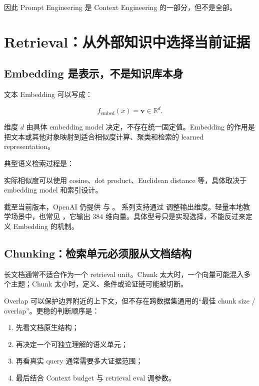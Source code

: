 \documentclass[profile=standard,twoside=false]{ipara-handbook}
\begin{document}
因此 Prompt Engineering 是 Context Engineering 的一部分，但不是全部。

\section{Retrieval：从外部知识中选择当前证据}

\subsection{Embedding 是表示，不是知识库本身}

文本 Embedding 可以写成：

$$
f_{\text{embed}}(x)=\boldsymbol{v}\in\mathbb{R}^{d}.
$$

维度 $d$ 由具体 embedding model 决定，不存在统一固定值。Embedding 的作用是把文本或其他对象映射到适合相似度计算、聚类和检索的 learned representation。

典型语义检索过程是：

\begin{processchain}
\end{processchain}

实际相似度可以使用 cosine、dot product、Euclidean distance 等，具体取决于 embedding model 和索引设计。

截至当前版本，OpenAI 仍提供  与 。 系列支持通过  调整输出维度。轻量本地教学场景中，也常见 ，它输出 $384$ 维向量。具体型号只是实现选择，不能反过来定义 Embedding 的机制。

\subsection{Chunking：检索单元必须服从文档结构}

长文档通常不适合作为一个 retrieval unit。Chunk 太大时，一个向量可能混入多个主题；Chunk 太小时，定义、条件或论证链可能被切断。

Overlap 可以保护边界附近的上下文，但不存在跨数据集通用的“最佳 chunk size / overlap”。更稳的判断顺序是：

\begin{enumerate}
  \item 先看文档原生结构；
  \item 再决定一个可独立理解的语义单元；
  \item 再看真实 query 通常需要多大证据范围；
  \item 最后结合 Context budget 与 retrieval eval 调参数。
\end{enumerate}
\end{document}
